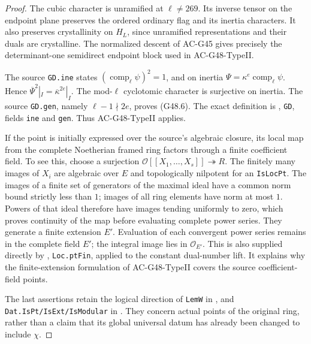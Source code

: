 \begin{proof}
The cubic character is unramified at $\ell\ne269$.
Its inverse tensor on the endpoint plane preserves the
ordered ordinary flag and its inertia characters.  It
also preserves crystallinity on $H_L$, since unramified
representations and their duals are crystalline.  The
normalized descent of AC-G45 gives precisely the determinant-one
semidirect endpoint block used in AC-G48-TypeII.

The source \texttt{GD.ine} states
$(\operatorname{comp}_\ell\psi)^2=1$, and on inertia
$\Psi=\kappa^e\operatorname{comp}_\ell\psi$.
Hence $\overline\Psi^{2}|_I=
\overline\kappa^{2e}|_I$.
The mod-$\ell$ cyclotomic character is surjective on
inertia.  The source \texttt{GD.gen}, namely
$\ell-1\nmid2e$, proves (G48.6).
The exact definition is
,
\texttt{GD}, fields \texttt{ine} and \texttt{gen}.
Thus AC-G48-TypeII applies.

If the point is initially expressed over the source's
algebraic closure, its local map from the complete
Noetherian framed ring factors through a finite
coefficient field.  To see this, choose a surjection
$\mathcal O[[X_1,\ldots,X_s]]\twoheadrightarrow R$.
The finitely many images of $X_i$ are algebraic over
$E$ and topologically nilpotent for an \texttt{IsLocPt}.
The images of a finite set of generators of the maximal
ideal have a common norm bound strictly less than $1$;
images of all ring elements have norm at most $1$.  Powers
of that ideal therefore have images tending uniformly to
zero, which proves continuity of the map before evaluating
complete power series.
They generate a finite extension $E'$.  Evaluation of each
convergent power series remains in the complete field $E'$;
the integral image lies in $\mathcal O_{E'}$.
This is also supplied directly by
, \texttt{Loc.ptFin},
applied to the constant dual-number lift.
It explains why the finite-extension formulation of
AC-G48-TypeII covers the source coefficient-field points.

The last assertions retain the logical direction of
\texttt{LemW} in
,
and \texttt{Dat.IsPt/IsExt/IsModular} in
.
They concern actual points of the original ring, rather
than a claim that its global universal datum has already
been changed to include $\chi$.
\end{proof}

